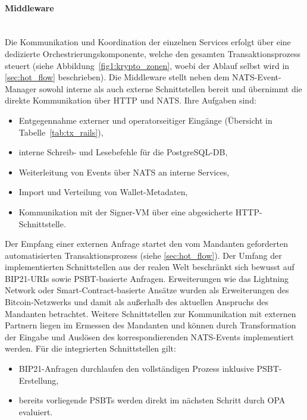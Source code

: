 \paragraph{Middleware} \mbox{}\\
Die Kommunikation und Koordination der einzelnen Services erfolgt über eine dedizierte Orchestrierungskomponente, welche den gesamten Transaktionsprozess steuert (siehe Abbildung~\ref{fig1:krypto_zonen}, woebi der Ablauf selbst wird in \ref{sec:hot_flow} beschrieben).
Die Middleware stellt neben dem \ac{NATS}-Event-Manager sowohl interne als auch externe Schnittstellen bereit und übernimmt die direkte Kommunikation über \ac{HTTP} und \ac{NATS}. Ihre Aufgaben sind:
\begin{itemize}
    \item Entgegennahme externer und operatorseitiger Eingänge (Übersicht in Tabelle~\ref{tab:tx_rails}),
    \item interne Schreib- und Lesebefehle für die PostgreSQL-\ac{DB},
    \item Weiterleitung von Events über \ac{NATS} an interne Services,
    \item Import und Verteilung von Wallet-Metadaten,
    \item Kommunikation mit der Signer-\ac{VM} über eine abgesicherte \ac{HTTP}-Schnittstelle.
\end{itemize}

Der Empfang einer externen Anfrage startet den vom Mandanten geforderten automatisierten Transaktionsprozess (siehe \ref{sec:hot_flow}). Der Umfang der implementierten Schnittstellen aus der realen Welt beschränkt sich bewusst auf \ac{BIP}21-\acp{URI} sowie \ac{PSBT}-basierte Anfragen. Erweiterungen wie das Lightning Network oder Smart-Contract-basierte Ansätze wurden als Erweiterungen des Bitcoin-Netzwerks und damit als außerhalb des aktuellen Anspruchs des Mandanten betrachtet. Weitere Schnittstellen zur Kommunikation mit externen Partnern liegen im Ermessen des Mandanten und können durch Transformation der Eingabe und Auslösen des korrespondierenden \ac{NATS}-Events implementiert werden.
Für die integrierten Schnittstellen gilt:
\begin{itemize}
    \item \ac{BIP}21-Anfragen durchlaufen den vollständigen Prozess inklusive \ac{PSBT}-Erstellung,
    \item bereits vorliegende \acp{PSBT} werden direkt im nächsten Schritt durch \ac{OPA} evaluiert.
\end{itemize}

